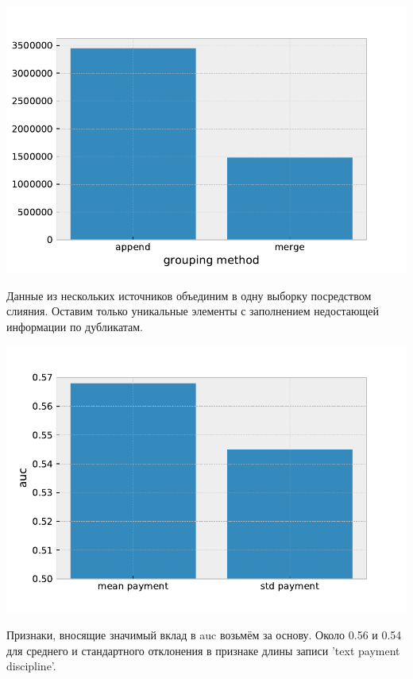 \documentclass[russian, 10pt]{beamer}
\begin{document}
\begin{frame}
\includegraphics[scale=0.7]{images/grouping.pdf}

Данные из нескольких источников объединим в одну выборку посредством слияния. Оставим только уникальные элементы с заполнением недостающей информации по дубликатам.
\end{frame}


\begin{frame}

\includegraphics[scale=0.7]{images/meanstd_auc.pdf}

Признаки, вносящие значимый вклад в auc возьмём за основу. Около 0.56 и 0.54 для среднего и стандартного отклонения в признаке длины записи 'text payment discipline'.

\end{frame}
\end{document}
